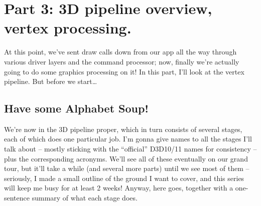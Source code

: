 \documentclass[12pt]{article}
\begin{document}
\section{Part 3: 3D pipeline overview, vertex processing.}
\label{sec:org67be869}
\label{part3}

At this point, we’ve sent draw calls down from our app all the way through various driver layers and the command processor; now, finally we’re actually going to do some graphics processing on it! In this part, I’ll look at the vertex pipeline.
But before we start…

\subsection{Have some Alphabet Soup!}
\label{sec:org3b224f3}

We’re now in the 3D pipeline proper, which in turn consists of several stages, each of which does one particular job.
I’m gonna give names to all the stages I’ll talk about – mostly sticking with the “official” D3D10/11 names for consistency – plus the corresponding acronyms.
We’ll see all of these eventually on our grand tour, but it’ll take a while (and several more parts) until we see most of them – seriously, I made a small outline of the ground I want to cover, and this series will keep me busy for at least 2 weeks! Anyway, here goes, together with a one-sentence summary of what each stage does.
\end{document}

